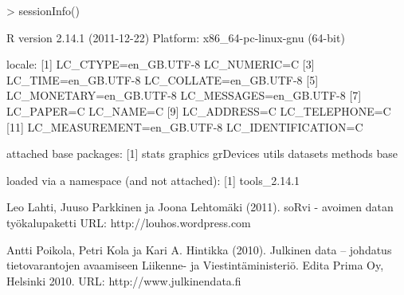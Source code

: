 \documentclass[a4paper,finnish]{article}
\begin{document}
\begin{Schunk}
\begin{Sinput}
> sessionInfo()
\end{Sinput}
\begin{Soutput}
R version 2.14.1 (2011-12-22)
Platform: x86_64-pc-linux-gnu (64-bit)

locale:
 [1] LC_CTYPE=en_GB.UTF-8       LC_NUMERIC=C              
 [3] LC_TIME=en_GB.UTF-8        LC_COLLATE=en_GB.UTF-8    
 [5] LC_MONETARY=en_GB.UTF-8    LC_MESSAGES=en_GB.UTF-8   
 [7] LC_PAPER=C                 LC_NAME=C                 
 [9] LC_ADDRESS=C               LC_TELEPHONE=C            
[11] LC_MEASUREMENT=en_GB.UTF-8 LC_IDENTIFICATION=C       

attached base packages:
[1] stats     graphics  grDevices utils     datasets  methods   base     

loaded via a namespace (and not attached):
[1] tools_2.14.1
\end{Soutput}
\end{Schunk}


% 

\begin{thebibliography}{1}

Leo Lahti, Juuso Parkkinen ja Joona Lehtomäki (2011).
\newblock soRvi - avoimen datan työkalupaketti
\newblock URL: http://louhos.wordpress.com

Antti Poikola, Petri Kola ja Kari A. Hintikka (2010).
\newblock Julkinen data – joh\-da\-tus tietovarantojen avaamiseen
\newblock Liikenne- ja Viestintäministeriö. Edita Prima Oy, Helsinki 2010.
\newblock URL: http://www.julkinendata.fi

%
%
\end{thebibliography}
\end{document}
